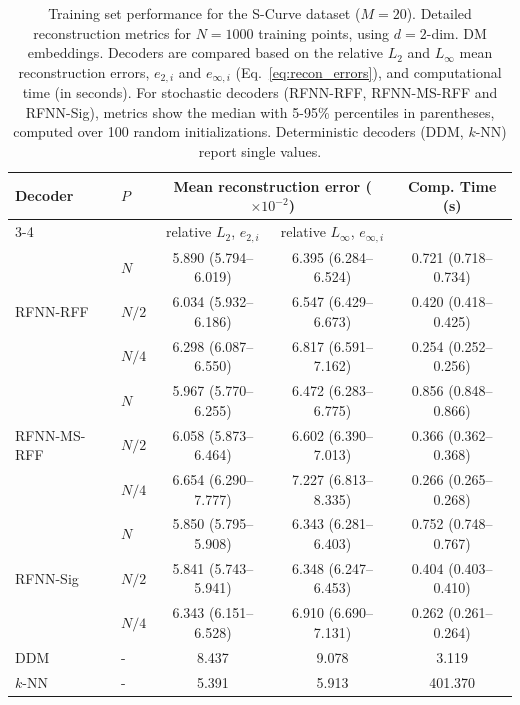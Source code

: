 \documentclass{article}
\begin{document}
\begin{table}[htbp]
\centering
\caption{Training set performance for the S-Curve dataset ($M=20$). Detailed reconstruction metrics for $N=1000$ training points, using $d=2$-dim. DM embeddings. Decoders are compared based on the relative $L_2$ and $L_\infty$ mean reconstruction errors, $e_{2,i}$ and $e_{\infty,i}$ (Eq.~\eqref{eq:recon_errors}), and computational time (in seconds). For stochastic decoders (RFNN-RFF, RFNN-MS-RFF and RFNN-Sig), metrics show the median with 5-95\% percentiles in parentheses, computed over 100 random initializations. Deterministic decoders (DDM, $k$-NN) report single values.}
\label{tab:SC20_dec_tr_all}
\begin{tabular}{@{}llccc@{}}
\multirow{2}{*}{Decoder} & \multirow{2}{*}{$P$} & \multicolumn{2}{c}{Mean reconstruction error ($\times 10^{-2}$)} & \multirow{2}{*}{Comp. Time (s)} \\
\cmidrule(lr){3-4}
& & relative $L_2$, $e_{2,i}$ &  relative $L_\infty$, $e_{\infty,i}$ &  \\
\midrule
\midrule

\multirow{3}{*}{RFNN-RFF} 
&	$N$	    & 5.890 (5.794--6.019) & 6.395 (6.284--6.524) & 0.721 (0.718--0.734) \\
&	$N/2$	& 6.034 (5.932--6.186) & 6.547 (6.429--6.673) & 0.420 (0.418--0.425) \\
&	$N/4$	& 6.298 (6.087--6.550) & 6.817 (6.591--7.162) & 0.254 (0.252--0.256) \\
\midrule

\multirow{3}{*}{RFNN-MS-RFF} 
&	$N$	    & 5.967 (5.770--6.255) & 6.472 (6.283--6.775) & 0.856 (0.848--0.866) \\
&	$N/2$	& 6.058 (5.873--6.464) & 6.602 (6.390--7.013) & 0.366 (0.362--0.368) \\
&	$N/4$	& 6.654 (6.290--7.777) & 7.227 (6.813--8.335) & 0.266 (0.265--0.268) \\
\midrule

\multirow{3}{*}{RFNN-Sig} 
&	$N$	    & 5.850 (5.795--5.908) & 6.343 (6.281--6.403) & 0.752 (0.748--0.767) \\
&	$N/2$	& 5.841 (5.743--5.941) & 6.348 (6.247--6.453) & 0.404 (0.403--0.410) \\
&	$N/4$	& 6.343 (6.151--6.528) & 6.910 (6.690--7.131) & 0.262 (0.261--0.264) \\
\midrule

DDM  &	-	&	8.437 & 9.078 & 3.119  \\
$k$-NN &	-	&	5.391 & 5.913 & 401.370  \\

\bottomrule
\end{tabular}%
\end{table}
\end{document}
